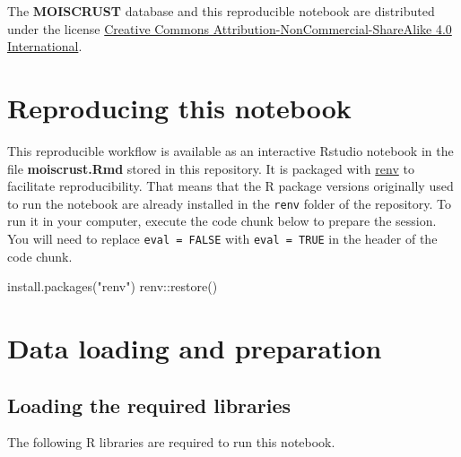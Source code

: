 \documentclass[
  table]{article}
\newenvironment{Shaded}{\begin{snugshade}}{\end{snugshade}}
\newcommand{\FunctionTok}[1]{\textcolor[rgb]{0.00,0.00,0.00}{#1}}
\newcommand{\NormalTok}[1]{#1}
\newcommand{\SpecialCharTok}[1]{\textcolor[rgb]{0.00,0.00,0.00}{#1}}
\newcommand{\StringTok}[1]{\textcolor[rgb]{0.31,0.60,0.02}{#1}}
\begin{document}
The \textbf{MOISCRUST} database and this reproducible notebook are
distributed under the license
\href{https://creativecommons.org/licenses/by/4.0/legalcode}{Creative
Commons Attribution-NonCommercial-ShareAlike 4.0 International}.

\newpage

\hypertarget{reproducing-this-notebook}{%
\section{Reproducing this notebook}\label{reproducing-this-notebook}}

This reproducible workflow is available as an interactive Rstudio
notebook in the file \textbf{moiscrust.Rmd} stored in this repository.
It is packaged with \href{https://cran.r-project.org/package=renv}{renv}
to facilitate reproducibility. That means that the R package versions
originally used to run the notebook are already installed in the
\texttt{renv} folder of the repository. To run it in your computer,
execute the code chunk below to prepare the session. You will need to
replace \texttt{eval\ =\ FALSE} with \texttt{eval\ =\ TRUE} in the
header of the code chunk.

\begin{Shaded}
\begin{Highlighting}[]
\FunctionTok{install.packages}\NormalTok{(}\StringTok{"renv"}\NormalTok{)}
\NormalTok{renv}\SpecialCharTok{::}\FunctionTok{restore}\NormalTok{()}
\end{Highlighting}
\end{Shaded}

\hypertarget{data-loading-and-preparation}{%
\section{Data loading and
preparation}\label{data-loading-and-preparation}}

\hypertarget{loading-the-required-libraries}{%
\subsection{Loading the required
libraries}\label{loading-the-required-libraries}}

The following R libraries are required to run this notebook.
\end{document}
